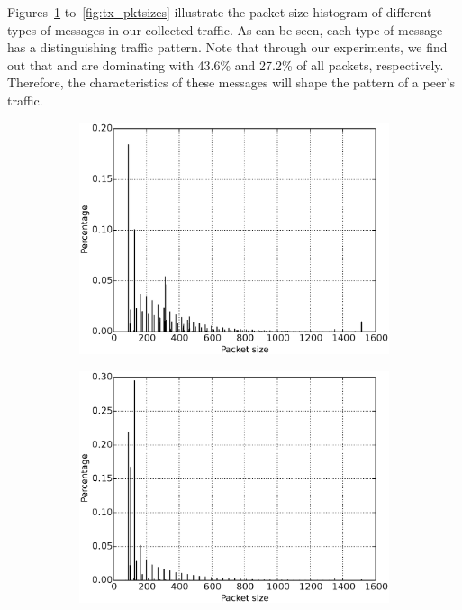 Figures~\ref{fig:inv_pktsizes} to~\ref{fig:tx_pktsizes} illustrate
the  packet size histogram of 
different types of \bc messages in our collected \bc traffic.
As can be seen, each type of message has a distinguishing traffic pattern. Note that through our experiments, we find out that  and  are dominating with 43.6\% and 27.2\% of all packets, respectively. 
Therefore, the characteristics of these messages will shape the pattern of a \bc peer's traffic. 
\begin{figure}[h]
\begin{subfigure}{0.24\linewidth}
\includegraphics[width=\linewidth]{image/inv_pktsizes.eps}
\caption{}
\label{fig:inv_pktsizes}
\end{subfigure}
\begin{subfigure}{0.24\linewidth}
\includegraphics[width=\linewidth]{image/getdata_pktsizes.eps}

\end{subfigure}
\end{figure}
